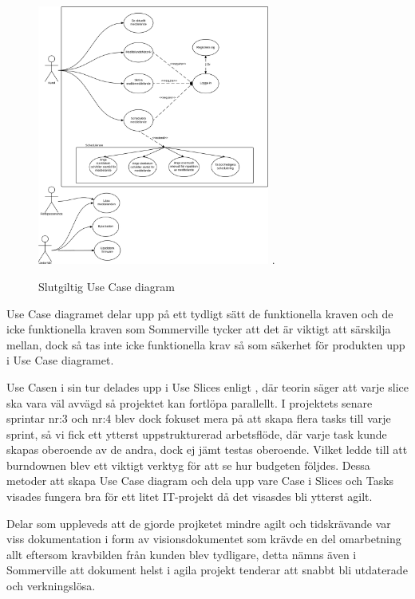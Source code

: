 \documentclass[conference,a4paper]{IEEEtran}
\begin{document}
\begin{figure}[H]
\centering
\includegraphics[width=3in]{PrimarUC}
\DeclareGraphicsExtensions.
\caption{Slutgiltig Use Case diagram}
\label{uc-diagram}
\end{figure}

Use Case diagramet delar upp på ett tydligt sätt de funktionella kraven och de icke funktionella kraven som Sommerville \cite{Sommerville10} tycker att det är viktigt att särskilja mellan, dock så tas inte icke funktionella krav så som säkerhet för produkten upp i Use Case diagramet. 

Use Casen i sin tur delades upp i Use Slices enligt \cite{Jacobson11}, där teorin säger att varje slice ska vara väl avvägd så projektet kan fortlöpa parallellt. I projektets senare sprintar nr:3 och nr:4 blev dock fokuset mera på att skapa flera tasks till varje sprint, så vi fick ett ytterst uppstrukturerad arbetsflöde, där varje task kunde skapas oberoende av de andra, dock ej jämt testas oberoende. Vilket ledde till att burndownen blev ett viktigt verktyg för att se hur budgeten följdes. Dessa metoder att skapa Use Case diagram och dela upp vare Case i Slices och Tasks visades fungera bra för ett litet IT-projekt då det visasdes bli ytterst agilt.

Delar som uppleveds att de gjorde projketet mindre agilt och tidskrävande var viss dokumentation i form av visionsdokumentet som krävde en del omarbetning allt eftersom kravbilden från kunden blev tydligare, detta nämns även i Sommerville \cite{Sommerville10} att dokument helst i agila projekt tenderar att snabbt bli utdaterade och verkningslösa.
\end{document}
